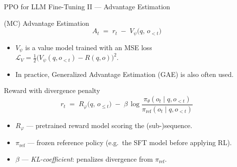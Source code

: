\documentclass[9pt]{beamer}
\begin{document}
\begin{frame}{PPO for LLM Fine-Tuning II — Advantage Estimation}

  \begin{block}{(MC) Advantage Estimation}
  \begin{equation}
      A_t \;=\; r_t \;-\; V_\psi\bigl(q,\,o_{<t}\bigr)
      \label{eq:mc_adv_est}
  \end{equation}
    \vspace{-0.2em}
    \begin{itemize}\setlength\itemsep{0.2em}
      \item $V_\psi$ is a value model trained with an MSE loss  
            $\mathcal{L}_V = \tfrac12\bigl(V_\psi(q,o_{<t}) - R(q,o)\bigr)^2$.
      \item In practice, Generalized Advantage Estimation (GAE) \cite{schulman2015} is also often used.
    \end{itemize}
  \end{block}

  \vspace{0.4em}

\pause
  \begin{block}{Reward with divergence penalty}
  \begin{equation}
      r_t \;=\; R_\varphi\bigl(q,\,o_{\le t}\bigr)
             \;-\; \beta\,\log\frac{\pi_\theta(o_t\mid q,o_{<t})}{\pi_{\text{ref}}(o_t\mid q,o_{<t})}
             \label{eq:reward_ppo}
  \end{equation}
    \vspace{-0.2em}
    \begin{itemize}\setlength\itemsep{0.2em}
      \item $R_\varphi$ — pretrained reward model scoring the (sub-)sequence.
      \item $\pi_{\text{ref}}$ — frozen reference policy (e.g.\ the SFT model before applying RL).
      \item $\beta$ — \textit{KL-coefficient}: penalizes divergence from $\pi_{\text{ref}}$.
    \end{itemize}
  \end{block}

\end{frame}
\end{document}
